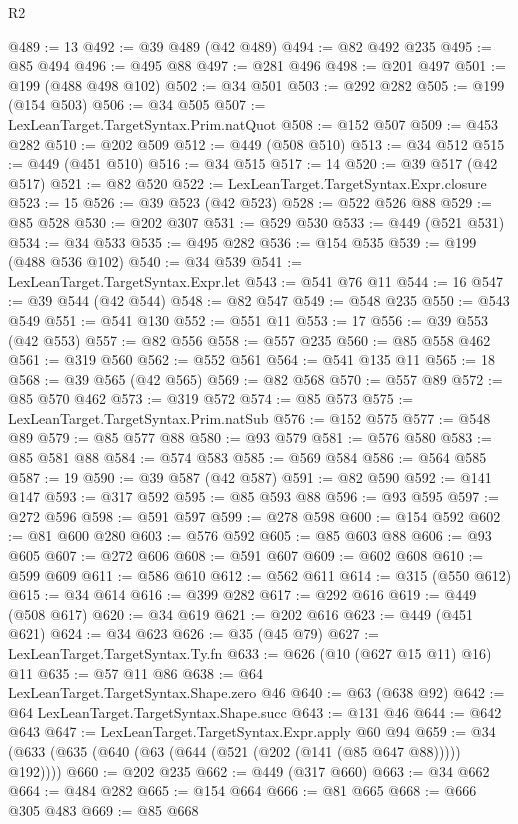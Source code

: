 \begin{lexlean}{R2}
\begin{coremodule}
@489 := 13
@492 := @39 @489 (@42 @489)
@494 := @82 @492 @235
@495 := @85 @494
@496 := @495 @88
@497 := @281 @496
@498 := @201 @497
@501 := @199 (@488 @498 @102)
@502 := @34 @501
@503 := @292 @282
@505 := @199 (@154 @503)
@506 := @34 @505
@507 := LexLeanTarget.TargetSyntax.Prim.natQuot
@508 := @152 @507
@509 := @453 @282
@510 := @202 @509
@512 := @449 (@508 @510)
@513 := @34 @512
@515 := @449 (@451 @510)
@516 := @34 @515
@517 := 14
@520 := @39 @517 (@42 @517)
@521 := @82 @520
@522 := LexLeanTarget.TargetSyntax.Expr.closure
@523 := 15
@526 := @39 @523 (@42 @523)
@528 := @522 @526 @88
@529 := @85 @528
@530 := @202 @307
@531 := @529 @530
@533 := @449 (@521 @531)
@534 := @34 @533
@535 := @495 @282
@536 := @154 @535
@539 := @199 (@488 @536 @102)
@540 := @34 @539
@541 := LexLeanTarget.TargetSyntax.Expr.let
@543 := @541 @76 @11
@544 := 16
@547 := @39 @544 (@42 @544)
@548 := @82 @547
@549 := @548 @235
@550 := @543 @549
@551 := @541 @130
@552 := @551 @11
@553 := 17
@556 := @39 @553 (@42 @553)
@557 := @82 @556
@558 := @557 @235
@560 := @85 @558 @462
@561 := @319 @560
@562 := @552 @561
@564 := @541 @135 @11
@565 := 18
@568 := @39 @565 (@42 @565)
@569 := @82 @568
@570 := @557 @89
@572 := @85 @570 @462
@573 := @319 @572
@574 := @85 @573
@575 := LexLeanTarget.TargetSyntax.Prim.natSub
@576 := @152 @575
@577 := @548 @89
@579 := @85 @577 @88
@580 := @93 @579
@581 := @576 @580
@583 := @85 @581 @88
@584 := @574 @583
@585 := @569 @584
@586 := @564 @585
@587 := 19
@590 := @39 @587 (@42 @587)
@591 := @82 @590
@592 := @141 @147
@593 := @317 @592
@595 := @85 @593 @88
@596 := @93 @595
@597 := @272 @596
@598 := @591 @597
@599 := @278 @598
@600 := @154 @592
@602 := @81 @600 @280
@603 := @576 @592
@605 := @85 @603 @88
@606 := @93 @605
@607 := @272 @606
@608 := @591 @607
@609 := @602 @608
@610 := @599 @609
@611 := @586 @610
@612 := @562 @611
@614 := @315 (@550 @612)
@615 := @34 @614
@616 := @399 @282
@617 := @292 @616
@619 := @449 (@508 @617)
@620 := @34 @619
@621 := @202 @616
@623 := @449 (@451 @621)
@624 := @34 @623
@626 := @35 (@45 @79)
@627 := LexLeanTarget.TargetSyntax.Ty.fn
@633 := @626 (@10 (@627 @15 @11) @16) @11
@635 := @57 @11 @86
@638 := @64 LexLeanTarget.TargetSyntax.Shape.zero @46
@640 := @63 (@638 @92)
@642 := @64 LexLeanTarget.TargetSyntax.Shape.succ
@643 := @131 @46
@644 := @642 @643
@647 := LexLeanTarget.TargetSyntax.Expr.apply @60 @94
@659 := @34 (@633 (@635 (@640 (@63 (@644 (@521 (@202 (@141 (@85 @647 @88))))) @192))))
@660 := @202 @235
@662 := @449 (@317 @660)
@663 := @34 @662
@664 := @484 @282
@665 := @154 @664
@666 := @81 @665
@668 := @666 @305 @483
@669 := @85 @668

\end{coremodule}
\end{lexlean}
